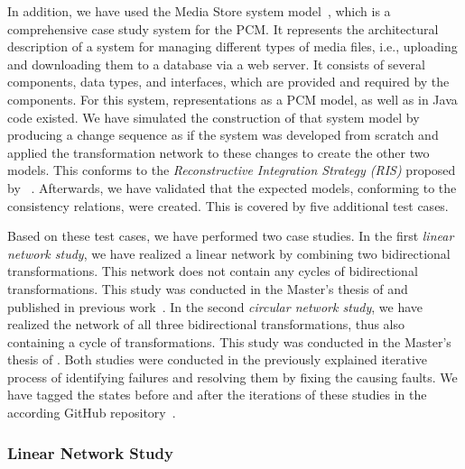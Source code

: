 In addition, we have used the Media Store system model~\cite{strittmatter2016a}, which is a comprehensive case study system for the \gls{PCM}.
It represents the architectural description of a system for managing different types of media files, i.e., uploading and downloading them to a database via a web server.
It consists of several components, data types, and interfaces, which are provided and required by the components.
For this system, representations as a \gls{PCM} model, as well as in Java code existed.
We have simulated the construction of that system model by producing a change sequence as if the system was developed from scratch and applied the transformation network to these changes to create the other two models.
This conforms to the \emph{Reconstructive Integration Strategy (RIS)} proposed by \citeauthor{langhammer2017a}~\cite{langhammer2017a,klare2020Vitruv-JSS}.
Afterwards, we have validated that the expected models, conforming to the consistency relations, were created.
This is covered by five additional test cases.

Based on these test cases, we have performed two case studies.
In the first \emph{linear network study}, we have realized a linear network by combining two bidirectional transformations. This network does not contain any cycles of bidirectional transformations.
This study was conducted in the Master's thesis of \textcite{syma2018ma} and published in previous work~.
In the second \emph{circular network study}, we have realized the network of all three bidirectional transformations, thus also containing a cycle of transformations.
This study was conducted in the Master's thesis of \textcite{saglam2020ma}.
Both studies were conducted in the previously explained iterative process of identifying failures and resolving them by fixing the causing faults.
We have tagged the states before and after the iterations of these studies in the according GitHub repository~\cite{vitruvCBSEGithub}.

\subsubsection*{Linear Network Study} 


